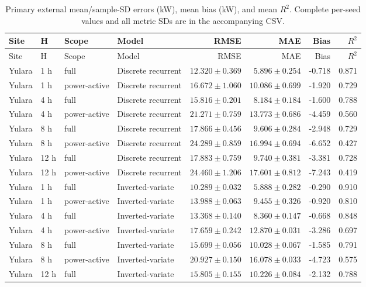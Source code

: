 \begin{longtable}{lll l rrrr}
\caption{Primary external mean/sample-SD errors (kW), mean bias (kW), and mean $R^2$. Complete per-seed values and all metric SDs are in the accompanying CSV.}\label{tabs:externalPrimary}\\
\toprule Site & H & Scope & Model & RMSE & MAE & Bias & $R^2$\\\midrule
\endfirsthead\toprule Site & H & Scope & Model & RMSE & MAE & Bias & $R^2$\\\midrule\endhead
Yulara & 1 h & full & Discrete recurrent & $12.320\pm0.369$ & $5.896\pm0.254$ & -0.718 & 0.871\\
Yulara & 1 h & power-active & Discrete recurrent & $16.672\pm1.060$ & $10.086\pm0.699$ & -1.920 & 0.729\\
Yulara & 4 h & full & Discrete recurrent & $15.816\pm0.201$ & $8.184\pm0.184$ & -1.600 & 0.788\\
Yulara & 4 h & power-active & Discrete recurrent & $21.271\pm0.759$ & $13.773\pm0.686$ & -4.459 & 0.560\\
Yulara & 8 h & full & Discrete recurrent & $17.866\pm0.456$ & $9.606\pm0.284$ & -2.948 & 0.729\\
Yulara & 8 h & power-active & Discrete recurrent & $24.289\pm0.859$ & $16.994\pm0.694$ & -6.652 & 0.427\\
Yulara & 12 h & full & Discrete recurrent & $17.883\pm0.759$ & $9.740\pm0.381$ & -3.381 & 0.728\\
Yulara & 12 h & power-active & Discrete recurrent & $24.460\pm1.206$ & $17.601\pm0.812$ & -7.243 & 0.419\\
Yulara & 1 h & full & Inverted-variate & $10.289\pm0.032$ & $5.888\pm0.282$ & -0.290 & 0.910\\
Yulara & 1 h & power-active & Inverted-variate & $13.988\pm0.063$ & $9.455\pm0.326$ & -0.920 & 0.810\\
Yulara & 4 h & full & Inverted-variate & $13.368\pm0.140$ & $8.360\pm0.147$ & -0.668 & 0.848\\
Yulara & 4 h & power-active & Inverted-variate & $17.659\pm0.242$ & $12.870\pm0.031$ & -3.286 & 0.697\\
Yulara & 8 h & full & Inverted-variate & $15.699\pm0.056$ & $10.028\pm0.067$ & -1.585 & 0.791\\
Yulara & 8 h & power-active & Inverted-variate & $20.927\pm0.150$ & $16.078\pm0.033$ & -4.723 & 0.575\\
Yulara & 12 h & full & Inverted-variate & $15.805\pm0.155$ & $10.226\pm0.084$ & -2.132 & 0.788\\

\end{longtable}
